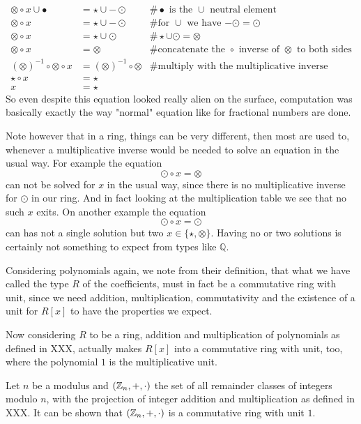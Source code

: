 \begin{example}
\begin{align*}
\otimes \circ x \cup \bullet &= \star \cup -\odot & \text{\# $\bullet$ is the $\cup$ neutral element}\\
\otimes \circ x &= \star \cup -\odot & \text{\# for $\cup$ we have $-\odot = \odot$} \\
\otimes \circ x &= \star \cup \odot &\# \star \cup \odot = \otimes \\
\otimes \circ x &= \otimes  &\text{\# concatenate the $\circ$ inverse of $\otimes$ to both sides}\\
(\otimes)^{-1}\circ \otimes \circ x &= (\otimes)^{-1}\circ \otimes & \text{\# multiply with the multiplicative inverse}\\
\star \circ x &= \star\\
x &= \star
\end{align*}
So even despite this equation looked really alien on the surface, computation was basically exactly the way "normal" equation like for fractional numbers are done.

Note however that in a ring, things can be very different, then most are used to, whenever a multiplicative inverse would be needed to solve an equation in the usual way. For example the equation
$$
\odot \circ x = \otimes
$$
can not be solved for $x$ in the usual way, since there is no multiplicative inverse for $\odot$ in our ring. And in fact looking at the multiplication table we see that no such $x$ exits. On another example the equation
$$
\odot \circ x = \odot
$$
can has not a single solution but two $x\in\{\star, \otimes\}$. Having no or two solutions is certainly not something to expect from types like $\mathbb{Q}$. 
\end{example}
\begin{example} Considering polynomials again, we note from their definition, that what we have called the type $R$ of the coefficients, must in fact be a commutative ring with unit, since we need addition, multiplication, commutativity and the existence of a unit for $R[x]$ to have the properties we expect. 

Now considering $R$ to be a ring, addition and multiplication of polynomials as defined in XXX, actually makes $R[x]$ into a commutative ring with unit, too, where the polynomial $1$ is the multiplicative unit.
\end{example}
\begin{example} Let $n$ be a modulus and $(\mathbb{Z}_n,+,\cdot)$ the set of all remainder classes of integers modulo $n$, with the projection of integer addition and multiplication as defined in XXX. It can be shown that $(\mathbb{Z}_n,+,\cdot)$ is a commutative ring with unit $1$.
\end{example}
